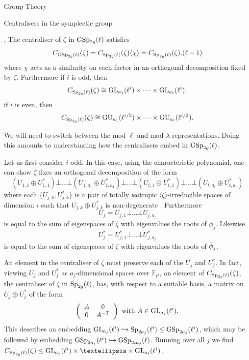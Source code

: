 \documentclass[11pt,a4paper]{article}
\newcommand{\Fli}{\mathbb{F}_{\ell^i}}
\begin{document}
\begin{section}{Group Theory}
\begin{subsection}{Centralisers in the symplectic group}
\begin{theorem}{\cite[Remark 3.4.4]{Burness}, \cite[Page 36]{wall}}
\label{centralisers_in_Sp}
The centraliser of $\zeta$ in $\GSp_{2g}(\ell)$ satisfies
$$C_{\GSp_{2g}(\ell)}(\zeta) = C_{\Sp_{2g}(\ell)}(\zeta)\langle \chi \rangle = C_{\Sp_{2g}(\ell)}(\zeta).(\ell-1) $$
where $\chi$ acts as a similarity on each factor in an orthogonal decomposition fixed by $\zeta$.
Furthermore if $i$ is odd, then
$$ C_{\Sp_{2g}(\ell)}(\zeta) \cong \GL_{a_1}(\ell^i) \times \cdots \times  \GL_{a_t}(\ell^i),$$
if $i$ is even, then
$$ C_{\Sp_{2g}(\ell)}(\zeta) \cong \GU_{a_1}(\ell^{i/2}) \times \cdots \times  \GU_{a_t}(\ell^{i/2}).$$
\end{theorem}

We will need to switch between the mod $\ell$ and mod $\lambda$ representations. Doing this amounts to understanding how the centralisers embed in $\GSp_{2g}(\ell)$.

Let us first consider $i$ odd.
In this case, using the characteristic polynomial, one can show $\zeta$ fixes an orthogonal decomposition of the form $$(U_{1,1} \oplus U_{1,1}^*) \bot \ldots \bot (U_{1,a_1}\oplus U_{1,a_1}^*) \bot \ldots \bot (U_{t,1}\oplus U_{t,1}^*) \bot \ldots \bot (U_{t,a_t}\oplus U_{t,a_t}^*)$$
where each $\{ U_{j,k}, U_{j,k}^*\}$ is a pair of totally isotropic $\langle \zeta \rangle$-irreducible spaces of dimension $i$ such that $U_{j,k} \oplus U_{j,k}^*$ is non-degenerate \cite[Prop. 3.4.3]{Burness}.
Furthermore $$U_j = U_{j,1} \bot \ldots \bot U_{j,a_j} $$ is equal to the sum of eigenspaces of $\zeta$ with eigenvalues the roots of $\phi_j$. Likewise $$U_j^* = U_{j,1}^* \bot \ldots \bot U_{j,a_j}^* $$ is equal to the sum of eigenspaces of $\zeta$ with eigenvalues the roots of $\Bar{\phi}_j$.

An element in the centraliser of $\zeta$ must preserve each of the $U_j$ and $U_j^*$.
In fact, viewing $U_j$ and $U_j^*$ as $a_j$-dimensional spaces over $\Fli$, an element of $C_{\Sp_{2g}(\ell)}(\zeta)$, the centraliser of $\zeta$ in $\Sp_{2g}(\ell)$, has, with respect to a suitable basis, a matrix on $U_j\oplus U_j^*$ of the form
$$ \left(\begin{array}{cc}
    A & 0 \\
    0 & A^{-T}
\end{array}\right) \text{ with } A \in \GL_{a_j}(\ell^i).$$
This describes an embedding $\GL_{a_j}(\ell^i) \hookrightarrow \Sp_{2a_j}(\ell^i) \leq \GSp_{2a_j}(\ell^i)$, which may be followed by embedding $\GSp_{2a_j}(\ell^i) \hookrightarrow \GSp_{2ia_j}(\ell)$.
Running over all $j$ we find $C_{\Sp_{2g}(\ell)}(\zeta) \leq \GL_{a_1}(\ell^i)\times \ldots \times \GL_{a_t}(\ell^i)$.


\end{subsection}
\end{section}
\end{document}
